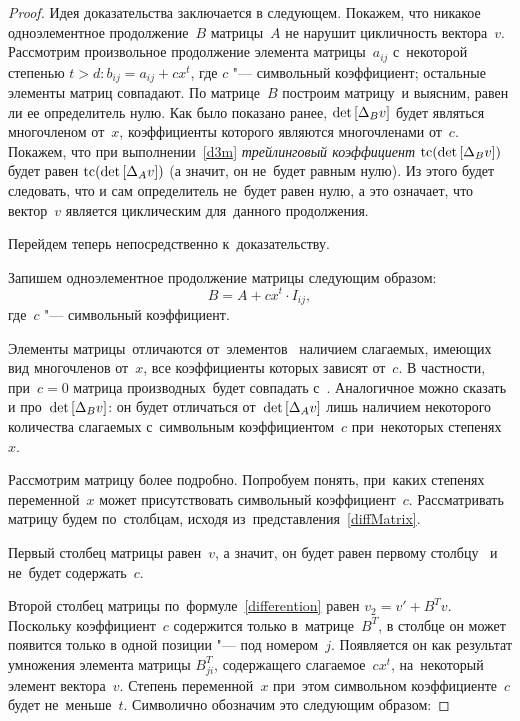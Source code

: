 \begin{proof}

Идея доказательства заключается в следующем.
Покажем, что никакое одноэлементное продолжение~$B$ матрицы~$A$ не нарушит цикличность вектора~$v$.
Рассмотрим произвольное продолжение элемента матрицы~$a_{ij}$ с~некоторой степенью $t > d: b_{ij} = a_{ij} + cx^t$,
где $c$ "--- символьный коэффициент; остальные элементы матриц совпадают.
По матрице~$B$ построим матрицу~\diffMatrix[B] и выясним, равен ли ее определитель нулю.
Как было показано ранее, $\mathop{\rm det} \text{$ [\Delta_B v] $}$ будет являться многочленом от~$x$, коэффициенты которого являются многочленами от~$c$.
Покажем, что при выполнении~\eqref{d3m} \textit{трейлинговый коэффициент} $\mathop{\rm tc} (\mathop{\rm det} \text{$ [\Delta_B v] $})$ будет равен $\mathop{\rm tc} (\mathop{\rm det} \text{$ [\Delta_A v] $})$
(а значит, он не~будет равным нулю).
Из этого будет следовать, что и сам определитель не~будет равен нулю, а это означает,
что вектор~$v$ является циклическим для~данного продолжения.
\medskip

\newpage
Перейдем теперь непосредственно к~доказательству.

Запишем одноэлементное продолжение матрицы следующим образом:
\begin{equation}
	B = A + cx^t \cdot I_{ij},
\end{equation}
где~$c$ "--- символьный коэффициент.

Элементы матрицы~\diffMatrix[B] отличаются от~элементов \diffMatrix\ наличием слагаемых, имеющих вид многочленов от~$x$, все коэффициенты которых зависят от~$c$.
В частности, при~$c = 0$ матрица производных~\diffMatrix[B] будет совпадать с~\diffMatrix.
Аналогичное можно сказать и про~$\mathop{\rm det} \text{$ [\Delta_B v] $}$: он будет отличаться от~$\mathop{\rm det} \text{$ [\Delta_A v] $}$ 
лишь наличием некоторого количества слагаемых с~символьным коэффициентом~$c$ при~некоторых степенях~$x$.
\medskip

Рассмотрим матрицу \diffMatrix[B] более подробно.
Попробуем понять, при~каких степенях переменной~$x$ может присутствовать символьный коэффициент~$c$.
Рассматривать матрицу будем по~столбцам, исходя из~представления~\eqref{diffMatrix}.

Первый столбец матрицы \diffMatrix[B] равен~$v$, а значит, он будет равен первому столбцу \diffMatrix\ и не~будет содержать~$c$.

Второй столбец матрицы \diffMatrix[B] по~формуле~\eqref{differention} равен $v_2 = v' + {B}^Tv$.
Поскольку коэффициент~$c$ 
содержится только в~матрице~${B}^T$, в столбце он может появится только в одной позиции "--- под номером~$j$.
Появляется он как результат умножения элемента матрицы $B^{T}_{ji}$,
содержащего слагаемое~$cx^t$, на~некоторый элемент вектора~$v$.
Степень переменной~$x$ при~этом символьном коэффициенте~$c$
будет не~меньше~$t$. Символично обозначим это следующим образом:


\end{proof}
